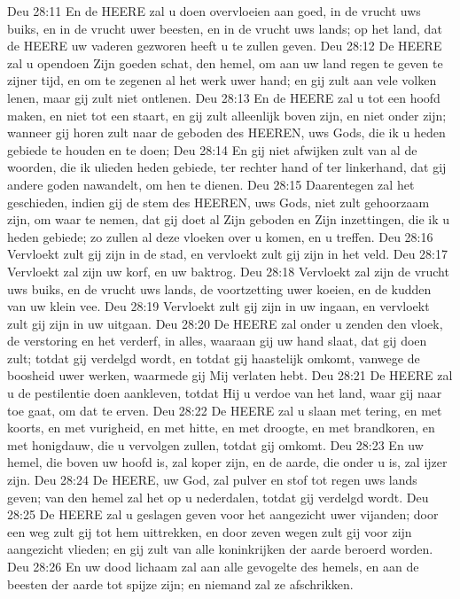 Deu 28:11  En de HEERE zal u doen overvloeien aan goed, in de vrucht uws buiks, en in de vrucht uwer beesten, en in de vrucht uws lands; op het land, dat de HEERE uw vaderen gezworen heeft u te zullen geven.
Deu 28:12  De HEERE zal u opendoen Zijn goeden schat, den hemel, om aan uw land regen te geven te zijner tijd, en om te zegenen al het werk uwer hand; en gij zult aan vele volken lenen, maar gij zult niet ontlenen.
Deu 28:13  En de HEERE zal u tot een hoofd maken, en niet tot een staart, en gij zult alleenlijk boven zijn, en niet onder zijn; wanneer gij horen zult naar de geboden des HEEREN, uws Gods, die ik u heden gebiede te houden en te doen;
Deu 28:14  En gij niet afwijken zult van al de woorden, die ik ulieden heden gebiede, ter rechter hand of ter linkerhand, dat gij andere goden nawandelt, om hen te dienen.
Deu 28:15  Daarentegen zal het geschieden, indien gij de stem des HEEREN, uws Gods, niet zult gehoorzaam zijn, om waar te nemen, dat gij doet al Zijn geboden en Zijn inzettingen, die ik u heden gebiede; zo zullen al deze vloeken over u komen, en u treffen.
Deu 28:16  Vervloekt zult gij zijn in de stad, en vervloekt zult gij zijn in het veld.
Deu 28:17  Vervloekt zal zijn uw korf, en uw baktrog.
Deu 28:18  Vervloekt zal zijn de vrucht uws buiks, en de vrucht uws lands, de voortzetting uwer koeien, en de kudden van uw klein vee.
Deu 28:19  Vervloekt zult gij zijn in uw ingaan, en vervloekt zult gij zijn in uw uitgaan.
Deu 28:20  De HEERE zal onder u zenden den vloek, de verstoring en het verderf, in alles, waaraan gij uw hand slaat, dat gij doen zult; totdat gij verdelgd wordt, en totdat gij haastelijk omkomt, vanwege de boosheid uwer werken, waarmede gij Mij verlaten hebt.
Deu 28:21  De HEERE zal u de pestilentie doen aankleven, totdat Hij u verdoe van het land, waar gij naar toe gaat, om dat te erven.
Deu 28:22  De HEERE zal u slaan met tering, en met koorts, en met vurigheid, en met hitte, en met droogte, en met brandkoren, en met honigdauw, die u vervolgen zullen, totdat gij omkomt.
Deu 28:23  En uw hemel, die boven uw hoofd is, zal koper zijn, en de aarde, die onder u is, zal ijzer zijn.
Deu 28:24  De HEERE, uw God, zal pulver en stof tot regen uws lands geven; van den hemel zal het op u nederdalen, totdat gij verdelgd wordt.
Deu 28:25  De HEERE zal u geslagen geven voor het aangezicht uwer vijanden; door een weg zult gij tot hem uittrekken, en door zeven wegen zult gij voor zijn aangezicht vlieden; en gij zult van alle koninkrijken der aarde beroerd worden.
Deu 28:26  En uw dood lichaam zal aan alle gevogelte des hemels, en aan de beesten der aarde tot spijze zijn; en niemand zal ze afschrikken.
